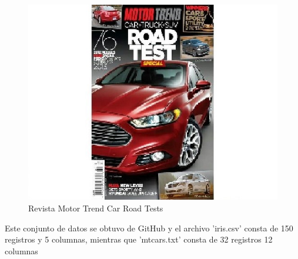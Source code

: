 \documentclass[conference]{IEEEtran}
\begin{document}
            \begin{figure}[H]
                \centering
                \includegraphics[scale=.4]{mtcars.jpg}
                \caption{Revista Motor Trend Car Road Tests}
            \end{figure}
    
    Este conjunto de datos se obtuvo de GitHub y el archivo 'iris.csv' consta de 150 registros y 5 columnas, mientras que 'mtcars.txt' consta de 32 registros 12 columnas
    
\end{document}
